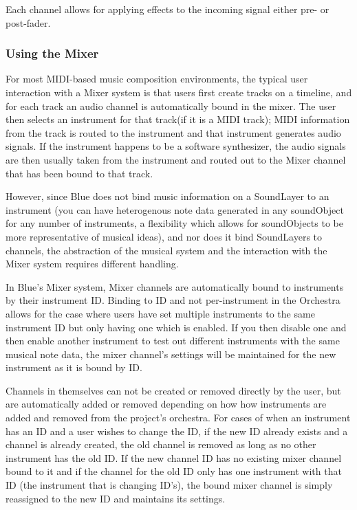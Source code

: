 Each channel allows for applying effects to the incoming signal either
pre- or post-fader.

\subsubsection{Using the Mixer}

For most MIDI-based music composition environments, the typical user
interaction with a Mixer system is that users first create tracks on a
timeline, and for each track an audio channel is automatically bound in
the mixer. The user then selects an instrument for that track(if it is a
MIDI track); MIDI information from the track is routed to the instrument
and that instrument generates audio signals. If the instrument happens
to be a software synthesizer, the audio signals are then usually taken
from the instrument and routed out to the Mixer channel that has been
bound to that track.

However, since Blue does not bind music information on a SoundLayer to
an instrument (you can have heterogenous note data generated in any
soundObject for any number of instruments, a flexibility which allows
for soundObjects to be more representative of musical ideas), and nor
does it bind SoundLayers to channels, the abstraction of the musical
system and the interaction with the Mixer system requires different
handling.

In Blue's Mixer system, Mixer channels are automatically bound to
instruments by their instrument ID. Binding to ID and not per-instrument
in the Orchestra allows for the case where users have set multiple
instruments to the same instrument ID but only having one which is
enabled. If you then disable one and then enable another instrument to
test out different instruments with the same musical note data, the
mixer channel's settings will be maintained for the new instrument as it
is bound by ID.

Channels in themselves can not be created or removed directly by the
user, but are automatically added or removed depending on how how
instruments are added and removed from the project's orchestra. For
cases of when an instrument has an ID and a user wishes to change the
ID, if the new ID already exists and a channel is already created, the
old channel is removed as long as no other instrument has the old ID. If
the new channel ID has no existing mixer channel bound to it and if the
channel for the old ID only has one instrument with that ID (the
instrument that is changing ID's), the bound mixer channel is simply
reassigned to the new ID and maintains its settings.

